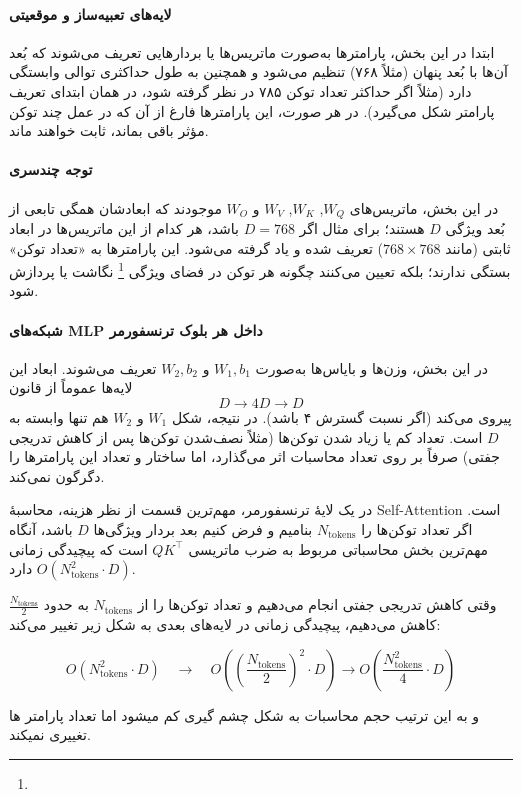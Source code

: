 \paragraph{لایه‌های تعبیه‌ساز و موقعیتی}
ابتدا در این بخش، پارامترها به‌صورت ماتریس‌ها یا بردارهایی تعریف می‌شوند که بُعد آن‌ها با بُعد پنهان (مثلاً ۷۶۸) تنظیم می‌شود و همچنین به طول حداکثری توالی وابستگی دارد (مثلاً اگر حداکثر تعداد توکن ۷۸۵ در نظر گرفته شود، در همان ابتدای تعریف پارامتر شکل می‌گیرد). در هر صورت، این پارامترها فارغ از آن که در عمل چند توکن مؤثر باقی بماند، ثابت خواهند ماند.

\paragraph{توجه چندسری}
در این بخش، ماتریس‌های $W_Q$, $W_K$, $W_V$ و $W_O$ موجودند که ابعادشان همگی تابعی از بُعد ویژگی $D$ هستند؛ برای مثال اگر $D = 768$ باشد، هر کدام از این ماتریس‌ها در ابعاد ثابتی (مانند $768 \times 768$) تعریف شده و یاد گرفته می‌شود. این پارامترها به «تعداد توکن» بستگی ندارند؛ بلکه تعیین می‌کنند چگونه هر توکن در فضای ویژگی \footnote{} نگاشت یا پردازش شود.

\paragraph{شبکه‌های MLP داخل هر بلوک ترنسفورمر}
در این بخش، وزن‌ها و بایاس‌ها به‌صورت $W_1, b_1$ و $W_2, b_2$ تعریف می‌شوند. ابعاد این لایه‌ها عموماً از قانون 
\[
D \to 4D \to D
\]
پیروی می‌کند (اگر نسبت گسترش ۴ باشد). در نتیجه، شکل $W_1$ و $W_2$ هم تنها وابسته به $D$ است. تعداد کم یا زیاد شدن توکن‌ها (مثلاً نصف‌شدن توکن‌ها پس از کاهش تدریجی جفتی) صرفاً بر روی تعداد محاسبات اثر می‌گذارد، اما ساختار و تعداد این پارامترها را دگرگون نمی‌کند.


در یک لایۀ ترنسفورمر، مهم‌ترین قسمت از نظر هزینه، محاسبۀ Self-Attention است. اگر تعداد توکن‌ها را $N_{\text{tokens}}$ بنامیم و فرض کنیم بعد بردار ویژگی‌ها $D$ باشد، آنگاه مهم‌ترین بخش محاسباتی مربوط به ضرب ماتریسی $QK^\top$ است که پیچیدگی زمانی \( O(N_{\text{tokens}}^2 \cdot D) \) دارد.


وقتی کاهش تدریجی جفتی انجام می‌دهیم و تعداد توکن‌ها را از $N_{\text{tokens}}$ به حدود $\frac{N_{\text{tokens}}}{2}$ کاهش می‌دهیم، پیچیدگی زمانی در لایه‌های بعدی به شکل زیر تغییر می‌کند:

\[
O(N_{\text{tokens}}^2 \cdot D) \quad \longrightarrow \quad O\left(\left(\frac{N_{\text{tokens}}}{2}\right)^2 \cdot D\right) \longrightarrow  O\left(\frac{N_{\text{tokens}}^2}{4} \cdot D\right)
\]

و به این ترتیب حجم محاسبات به شکل چشم گیری کم میشود اما تعداد پارامتر ها تغییری نمیکند.






